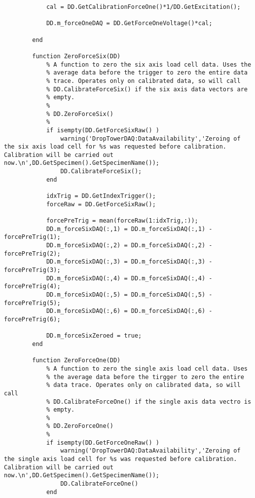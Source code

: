 \begin{lstlisting}
            cal = DD.GetCalibrationForceOne()*1/DD.GetExcitation();
            
            DD.m_forceOneDAQ = DD.GetForceOneVoltage()*cal;
            
        end
        
        function ZeroForceSix(DD)
            % A function to zero the six axis load cell data. Uses the
            % average data before the trigger to zero the entire data
            % trace. Operates only on calibrated data, so will call
            % DD.CalibrateForceSix() if the six axis data vectors are
            % empty.
            %
            % DD.ZeroForceSix()
            %
            if isempty(DD.GetForceSixRaw() )
                warning('DropTowerDAQ:DataAvailability','Zeroing of the six axis load cell for %s was requested before calibration. Calibration will be carried out now.\n',DD.GetSpecimen().GetSpecimenName());
                DD.CalibrateForceSix();
            end
            
            idxTrig = DD.GetIndexTrigger();
            forceRaw = DD.GetForceSixRaw();
            
            forcePreTrig = mean(forceRaw(1:idxTrig,:));
            DD.m_forceSixDAQ(:,1) = DD.m_forceSixDAQ(:,1) - forcePreTrig(1);
            DD.m_forceSixDAQ(:,2) = DD.m_forceSixDAQ(:,2) - forcePreTrig(2);
            DD.m_forceSixDAQ(:,3) = DD.m_forceSixDAQ(:,3) - forcePreTrig(3);
            DD.m_forceSixDAQ(:,4) = DD.m_forceSixDAQ(:,4) - forcePreTrig(4);
            DD.m_forceSixDAQ(:,5) = DD.m_forceSixDAQ(:,5) - forcePreTrig(5);
            DD.m_forceSixDAQ(:,6) = DD.m_forceSixDAQ(:,6) - forcePreTrig(6);
            
            DD.m_forceSixZeroed = true;
        end
        
        function ZeroForceOne(DD)
            % A function to zero the single axis load cell data. Uses
            % the average data before the tirgger to zero the entire
            % data trace. Operates only on calibrated data, so will call
            % DD.CalibrateForceOne() if the single axis data vectro is
            % empty.
            %
            % DD.ZeroForceOne()
            %
            if isempty(DD.GetForceOneRaw() )
                warning('DropTowerDAQ:DataAvailability','Zeroing of the single axis load cell for %s was requested before calibration. Calibration will be carried out now.\n',DD.GetSpecimen().GetSpecimenName());
                DD.CalibrateForceOne()
            end
            

\end{lstlisting}
